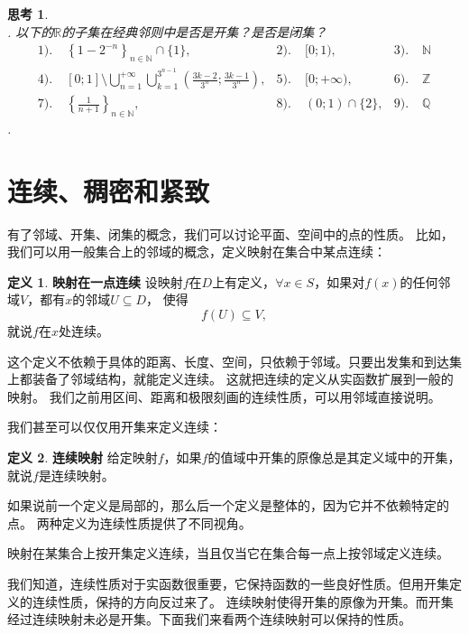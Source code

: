 \documentclass[12pt,UTF8]{ctexbook}
\theoremstyle{definition}
\newtheorem{df}{定义}[section]
\theoremstyle{plain}
\newtheorem{sk}{思考}[section]
\begin{document}
\begin{sk}
    \mbox{} \\
    . 以下的$\mathbb{R}$的子集在经典邻则中是否是开集？是否是闭集？\\
    \begin{align*}
        1).& \;\left\{1 - 2^{-n}\right\}_{n\in\mathbb{N}}\cap\{1\},  &2).& \;[0;1),  &3).& \;\mathbb{N} \\
        4).& \; [0;1]\setminus \bigcup_{n=1}^{+\infty} \bigcup_{k=1}^{3^{n-1}} \left(\frac{3k - 2}{3^n};\frac{3k - 1}{3^n}\right),  &5).& \;[0;+\infty), &6).& \;\mathbb{Z} \\
        7).& \;\left\{\frac{1}{n+1}\right\}_{n\in\mathbb{N}},  &8).& \;(0;1)\cap\{2\}, &9).& \; \mathbb{Q}
    \end{align*}
    . 
\end{sk}

\section{连续、稠密和紧致}

有了邻域、开集、闭集的概念，我们可以讨论平面、空间中的点的性质。
比如，我们可以用一般集合上的邻域的概念，定义映射在集合中某点连续：
\begin{df}{\textbf{映射在一点连续}}
    设映射$f$在$D$上有定义，$\forall x\in S$，如果对$f(x)$的任何邻域$V$，都有$x$的邻域$U\subseteq D$，
    使得
    $$ f(U) \subseteq V,$$
    就说$f$在$x$处连续。
\end{df}
这个定义不依赖于具体的距离、长度、空间，只依赖于邻域。只要出发集和到达集上都装备了邻域结构，就能定义连续。
这就把连续的定义从实函数扩展到一般的映射。
我们之前用区间、距离和极限刻画的连续性质，可以用邻域直接说明。

我们甚至可以仅仅用开集来定义连续：
\begin{df}{\textbf{连续映射}}
    给定映射$f$，如果$f$的值域中开集的原像总是其定义域中的开集，就说$f$是连续映射。
\end{df}

如果说前一个定义是局部的，那么后一个定义是整体的，因为它并不依赖特定的点。
两种定义为连续性质提供了不同视角。

映射在某集合上按开集定义连续，当且仅当它在集合每一点上按邻域定义连续。

我们知道，连续性质对于实函数很重要，它保持函数的一些良好性质。但用开集定义的连续性质，保持的方向反过来了。
连续映射使得开集的原像为开集。而开集经过连续映射未必是开集。下面我们来看两个连续映射可以保持的性质。
\end{document}

